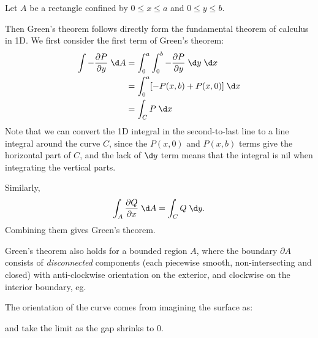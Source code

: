 \documentclass[a4paper]{article}
\begin{document}
\begin{eg}
  Let $A$ be a rectangle confined by $0 \leq x \leq a$ and $0 \leq y \leq b$.
  \begin{center}
  \end{center}
  Then Green's theorem follows directly form the fundamental theorem of calculus in 1D. We first consider the first term of Green's theorem:
  \begin{align*}
    \int -\frac{\partial P}{\partial y} \;\d A &= \int_0^a \int_0^b -\frac{\partial P}{\partial y}\;\d y\;\d x\\
    &= \int_0^a [-P(x, b) + P(x, 0)]\;\d x\\
    &= \int_C P\;\d x
  \end{align*}
  Note that we can convert the 1D integral in the second-to-last line to a line integral around the curve $C$, since the $P(x, 0)$ and $P(x, b)$ terms give the horizontal part of $C$, and the lack of $\d y$ term means that the integral is nil when integrating the vertical parts.

  Similarly,
  \[
    \int_A \frac{\partial Q}{\partial x}\;\d A = \int_C Q\;\d y.
  \]
  Combining them gives Green's theorem.
\end{eg}

Green's theorem also holds for a bounded region $A$, where the boundary $\partial A$ consists of \emph{disconnected} components (each piecewise smooth, non-intersecting and closed) with anti-clockwise orientation on the exterior, and clockwise on the interior boundary, eg.
\begin{center}
\end{center}
The orientation of the curve comes from imagining the surface as:
\begin{center}
\end{center}
and take the limit as the gap shrinks to 0.
\end{document}
